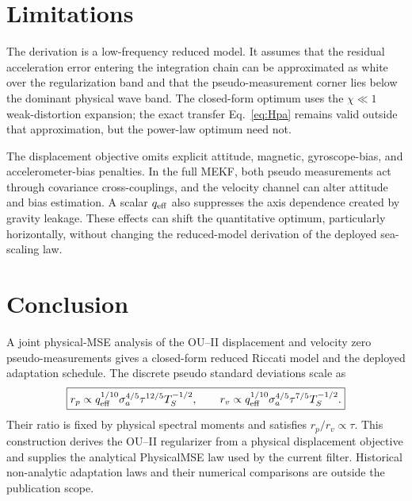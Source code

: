 \documentclass[conference]{IEEEtran}
\begin{document}
\section{Limitations}
\label{sec:limitations}

The derivation is a low-frequency reduced model. It assumes that the residual
acceleration error entering the integration chain can be approximated as white
over the regularization band and that the pseudo-measurement corner lies below
the dominant physical wave band. The closed-form optimum uses the
$\chi\ll1$ weak-distortion expansion; the exact transfer
Eq.~\eqref{eq:Hpa} remains valid outside that approximation, but the power-law
optimum need not.

The displacement objective omits explicit attitude, magnetic, gyroscope-bias,
and accelerometer-bias penalties. In the full MEKF, both pseudo measurements act
through covariance cross-couplings, and the velocity channel can alter attitude
and bias estimation. A scalar $q_{\rm eff}$ also suppresses the axis dependence
created by gravity leakage. These effects can shift the quantitative optimum,
particularly horizontally, without changing the reduced-model derivation of
the deployed sea-scaling law.

\section{Conclusion}

A joint physical-MSE analysis of the OU--II displacement and velocity zero
pseudo-measurements gives a closed-form reduced Riccati model and the deployed
adaptation schedule. The discrete pseudo standard deviations scale as
\begin{equation}
 \boxed{
 r_p\propto q_{\rm eff}^{1/10}\sigma_a^{4/5}\tau^{12/5}T_S^{-1/2},
 \qquad
 r_v\propto q_{\rm eff}^{1/10}\sigma_a^{4/5}\tau^{7/5}T_S^{-1/2}.}
\end{equation}
Their ratio is fixed by physical spectral moments and satisfies
$r_p/r_v\propto\tau$. This construction derives the OU--II regularizer from a
physical displacement objective and supplies the analytical PhysicalMSE law
used by the current filter. Historical non-analytic adaptation laws and their
numerical comparisons are outside the publication scope.



\end{document}
